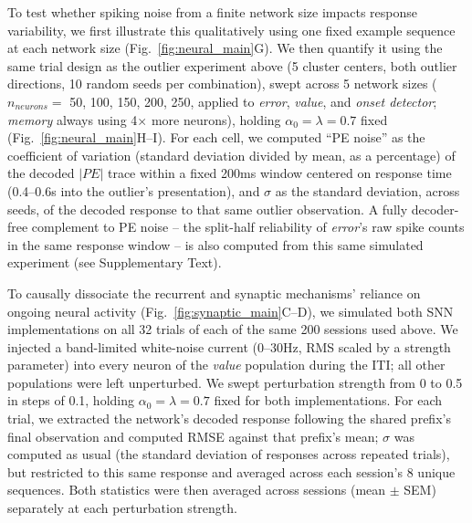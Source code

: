 \documentclass[12pt]{article}
\begin{document}
To test whether spiking noise from a finite network size impacts response variability, we first illustrate this qualitatively using one fixed example sequence at each network size (Fig.~\ref{fig:neural_main}G). We then quantify it using the same trial design as the outlier experiment above (5 cluster centers, both outlier directions, 10 random seeds per combination), swept across 5 network sizes ($n_{neurons}=$ 50, 100, 150, 200, 250, applied to \textit{error}, \textit{value}, and \textit{onset detector}; \textit{memory} always using 4$\times$ more neurons), holding $\alpha_0=\lambda=0.7$ fixed (Fig.~\ref{fig:neural_main}H--I). For each cell, we computed ``PE noise'' as the coefficient of variation (standard deviation divided by mean, as a percentage) of the decoded $|PE|$ trace within a fixed 200ms window centered on response time (0.4--0.6s into the outlier's presentation), and $\sigma$ as the standard deviation, across seeds, of the decoded response to that same outlier observation. A fully decoder-free complement to PE noise -- the split-half reliability of \textit{error}'s raw spike counts in the same response window -- is also computed from this same simulated experiment (see Supplementary Text).

To causally dissociate the recurrent and synaptic mechanisms' reliance on ongoing neural activity (Fig.~\ref{fig:synaptic_main}C--D), we simulated both SNN implementations on all 32 trials of each of the same 200 sessions used above. We injected a band-limited white-noise current (0--30Hz, RMS scaled by a strength parameter) into every neuron of the \textit{value} population during the ITI; all other populations were left unperturbed. We swept perturbation strength from 0 to 0.5 in steps of 0.1, holding $\alpha_0=\lambda=0.7$ fixed for both implementations. For each trial, we extracted the network's decoded response following the shared prefix's final observation and computed RMSE against that prefix's mean; $\sigma$ was computed as usual (the standard deviation of responses across repeated trials), but restricted to this same response and averaged across each session's 8 unique sequences. Both statistics were then averaged across sessions (mean $\pm$ SEM) separately at each perturbation strength.

\clearpage

\end{document}
